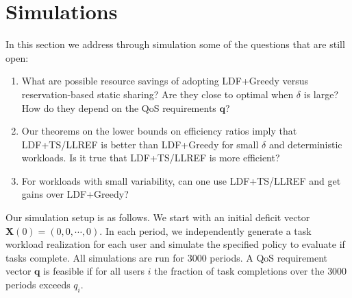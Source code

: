 \documentclass[prodmode,acmtompecs]{acmsmall}
\newcommand{\reqvec}{\mathbf{q}}
\newcommand{\reqscalar}{q}
\newcommand{\myComments}[1]{}
\newif\iftompecsextended
\newcommand{\tompecsextendedStart}{\iftompecsextended  \myComments{TOMPECS extended version: }}
\newcommand{\commentEnd}{\myComments{End}}
\begin{document}
\tompecsextendedStart
\begin{proposition}
\label{proposition_m_est_for_large_system}
For a SRT-MIC  system model with homogeneous users where all users have i.i.d. NBUE task workloads with mean $\mu$ and the same QoS requirement $\reqscalar$, if the period length satisfies $1 - \frac{\mu}{\delta} > \reqscalar$, then for any NBUE workload distribution and for any $\epsilon > 0$ satisfying $1 - (1+\epsilon) \frac{\mu}{\delta} > \reqscalar$, there exists $n^\prime$, such that for all $n \geq n^\prime$, 
$$
m = \Big\lceil \frac{nq \mu}{\delta - (1+\epsilon)\mu} \Big\rceil
$$
is a sufficient number of cores to meet the QoS requirement for $n$ users. 
\end{proposition}

By letting $\epsilon$ approach $0$, the $m$ in this proposition approaches $m_{\text{LDF+Greedy}}^\text{est}$. This is due to the law of large numbers and we omit the proof.  
\commentEnd\fi

\section{Simulations}
In this section we address through simulation some of the questions that are still open: 
\begin{enumerate}
\item What are possible resource savings of adopting LDF+Greedy versus reservation-based static sharing? 
		Are they close to optimal when $\delta$ is large? 
		How do they depend on the QoS requirements $\reqvec$? 
\item Our theorems on the lower bounds on efficiency ratios imply that LDF+TS/LLREF is better than LDF+Greedy for small $\delta$ and deterministic workloads. Is it true that LDF+TS/LLREF is more efficient? 
\item For workloads with small variability, can one use LDF+TS/LLREF and get gains over LDF+Greedy?  
\end{enumerate}

Our simulation setup is as follows. We start with an initial deficit vector $\mathbf{X}(0) = (0, 0, \cdots, 0)$. In each period, we independently generate a task workload realization for each user and simulate the specified policy to evaluate if tasks complete. All simulations are run for $3000$ periods. A QoS requirement vector $\reqvec$ is feasible if for all users $i$ the fraction of task completions over the $3000$ periods exceeds $\reqscalar_i$. 
\end{document}
